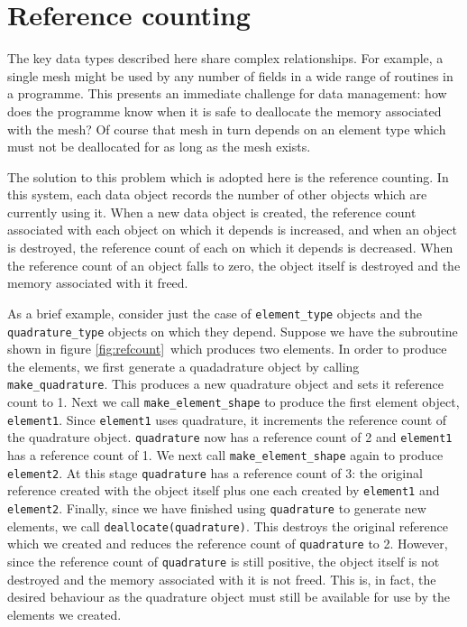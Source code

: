 \documentclass[a4paper, 11pt]{book}
\newcommand{\targetlabel}[1]{\hypertarget{#1}{}\label{#1}}
\begin{document}
\chapter{Reference counting}\targetlabel{chap:refcount}

The key data types described here share complex relationships. For example,
a single mesh might be used by any number of fields in a wide range of
routines in a programme. This presents an immediate challenge for data
management: how does the programme know when it is safe to deallocate the
memory associated with the mesh? Of course that mesh in turn depends on an
element type which must not be deallocated for as long as the mesh exists.

The solution to this problem which is adopted here is the reference
counting. In this system, each data object records the number of other
objects which are currently using it. When a new data object is created, the
reference count associated with each object on which it depends is
increased, and when an object is destroyed, the reference count of each on
which it depends is decreased. When the reference count of an object falls
to zero, the object itself is destroyed and the memory associated with it
freed.

As a brief example, consider just the case of \lstinline+element_type+
objects and the \lstinline+quadrature_type+ objects on which they
depend. Suppose we have the subroutine shown in figure
\ref{fig:refcount}\ which produces two elements. In order to produce the
elements, we first generate a quadadrature object by calling
\lstinline+make_quadrature+. This produces a new quadrature object and sets
it reference count to 1. Next we call \lstinline+make_element_shape+ to
produce the first element object, \lstinline+element1+. Since
\lstinline+element1+ uses quadrature, it increments the reference count of
the quadrature object. \lstinline+quadrature+  now has a reference count of 2
and \lstinline+element1+ has a reference count of 1. We next call
\lstinline+make_element_shape+ again to produce \lstinline+element2+. At this stage
\lstinline+quadrature+ has a reference count of 3: the original reference
created with the object itself plus one each created by \lstinline+element1+
and \lstinline+element2+. Finally, since we have finished using \lstinline+quadrature+
to generate new elements, we call \lstinline+deallocate(quadrature)+. This
destroys the original reference which we created and reduces the reference
count of \lstinline+quadrature+ to 2. However, since the reference count of
\lstinline+quadrature+ is still positive, the object itself is not destroyed
and the memory associated with it is not freed. This is, in fact, the
desired behaviour as the quadrature object must still be available for use
by the elements we created. 
\end{document}

